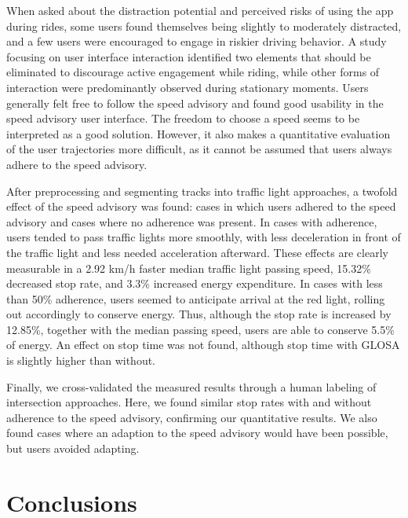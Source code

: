 \begin{Summary}
When asked about the distraction potential and perceived risks of using the app during rides, some users found themselves being slightly to moderately distracted, and a few users were encouraged to engage in riskier driving behavior. A study focusing on user interface interaction identified two elements that should be eliminated to discourage active engagement while riding, while other forms of interaction were predominantly observed during stationary moments. Users generally felt free to follow the speed advisory and found good usability in the speed advisory user interface. The freedom to choose a speed seems to be interpreted as a good solution. However, it also makes a quantitative evaluation of the user trajectories more difficult, as it cannot be assumed that users always adhere to the speed advisory.

After preprocessing and segmenting tracks into traffic light approaches, a twofold effect of the speed advisory was found: cases in which users adhered to the speed advisory and cases where no adherence was present. In cases with adherence, users tended to pass traffic lights more smoothly, with less deceleration in front of the traffic light and less needed acceleration afterward. These effects are clearly measurable in a 2.92 km/h faster median traffic light passing speed, 15.32\% decreased stop rate, and 3.3\% increased energy expenditure. In cases with less than 50\% adherence, users seemed to anticipate arrival at the red light, rolling out accordingly to conserve energy. Thus, although the stop rate is increased by 12.85\%, together with the median passing speed, users are able to conserve 5.5\% of energy. An effect on stop time was not found, although stop time with GLOSA is slightly higher than without.

Finally, we cross-validated the measured results through a human labeling of intersection approaches. Here, we found similar stop rates with and without adherence to the speed advisory, confirming our quantitative results. We also found cases where an adaption to the speed advisory would have been possible, but users avoided adapting.
\end{Summary}

\section{Conclusions}

